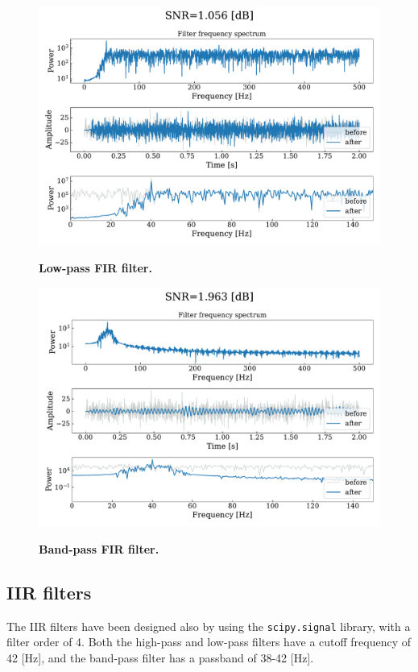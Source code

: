 \documentclass[13pt,a4paper]{article}
\begin{document}
\begin{figure}[ht!]
    \centering
    \caption{\textbf{Low-pass FIR filter.}}
    \includegraphics[width=0.9\linewidth]{fir.lowpass.pdf}
    \label{fig:fir.low-pass}
\end{figure}

\begin{figure}[ht!]
    \centering
    \caption{\textbf{Band-pass FIR filter.}}
    \includegraphics[width=0.9\linewidth]{fir.bandpass.pdf}
    \label{fig:fir.band-pass}
\end{figure}
\pagebreak


\subsection{IIR filters}

The IIR filters have been designed also by using the \verb|scipy.signal| library, with a filter order of 4. Both the high-pass and low-pass filters have a cutoff frequency of 42 [Hz], and the band-pass filter has a passband of 38-42 [Hz].
\end{document}
